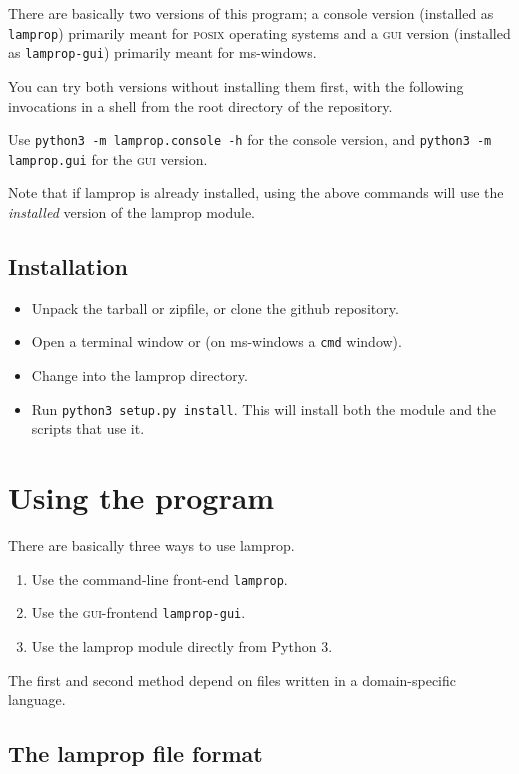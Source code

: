 \documentclass[a4paper,landscape,oneside,11pt,twocolumn]{memoir}
\begin{document}
There are basically two versions of this program; a console version (installed
as \texttt{lamprop}) primarily meant for \textsc{posix} operating systems and
a \textsc{gui} version (installed as \texttt{lamprop-gui}) primarily meant for
ms-windows.

You can try both versions without installing them first, with the following
invocations in a shell from the root directory of the repository.

Use \texttt{python3 -m lamprop.console -h} for the console version, and
\texttt{python3 -m lamprop.gui} for the \textsc{gui} version.

Note that if lamprop is already installed, using the above commands will use
the \emph{installed} version of the lamprop module.


\section{Installation} %

\begin{itemize}
    \item Unpack the tarball or zipfile, or clone the github repository.
    \item Open a terminal window or (on ms-windows a \texttt{cmd} window).
    \item Change into the lamprop directory.
    \item Run \texttt{python3 setup.py install}. This will install both the module and
the scripts that use it.
\end{itemize}


\chapter{Using the program} %

There are basically three ways to use lamprop.

\begin{enumerate}
    \item Use the command-line front-end \texttt{lamprop}.
    \item Use the \textsc{gui}-frontend \texttt{lamprop-gui}.
    \item Use the lamprop module directly from Python 3.
\end{enumerate}

The first and second method depend on files written in a domain-specific
language.

\section{The lamprop file format} %
\end{document}
